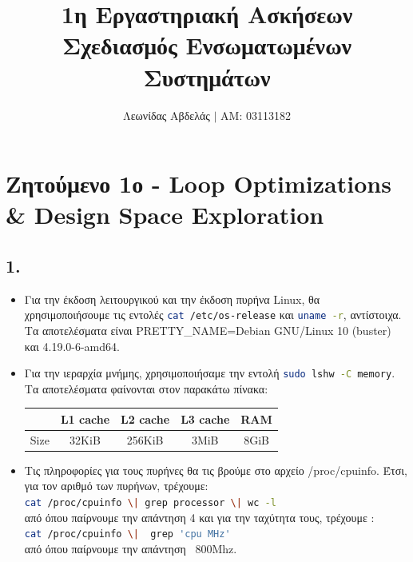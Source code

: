 \documentclass{article}
\title{1η Εργαστηριακή Ασκήσεων \\
        Σχεδιασμός Ενσωματωμένων Συστημάτων}
\newcommand{\english}[1]{\foreignlanguage{english}{{#1}}}
\begin{document}
\date{}
\author{Λεωνίδας Αβδελάς $|$ ΑΜ: 03113182}

\maketitle
\newpage

\section*{Ζητούμενο 1ο - \english{Loop Optimizations \\ \& Design Space Exploration}}

\subsection*{1.}
\begin{itemize}
    \item Για την έκδοση λειτουργικού και την έκδοση πυρήνα \english{Linux}, θα χρησιμοποιήσουμε τις εντολές \english{\lstinline[language=bash]{cat /etc/os-release}} και \english{\lstinline[language=bash]{uname -r}}, αντίστοιχα. Τα αποτελέσματα είναι \english{PRETTY\_NAME=Debian GNU/Linux 10 (buster)} και \english{4.19.0-6-amd64}.
    \item Για την ιεραρχία μνήμης, χρησιμοποιήσαμε την εντολή \english{\lstinline[language=bash]{sudo lshw -C memory}}. Τα αποτελέσματα φαίνονται στον παρακάτω πίνακα:\\
    \begin{otherlanguage}{english}
        \begin{center}
            \begin{tabular}{|c|c|c|c|c|}\hline
                & L1 cache & L2 cache & L3 cache & RAM \\ \hline
                Size & 32KiB & 256KiB & 3MiB & 8GiB \\ \hline
           \end{tabular}
        \end{center}
    \end{otherlanguage}
    \item Τις πληροφορίες για τους πυρήνες θα τις βρούμε στο αρχείο \english{/proc/cpuinfo}. Έτσι, για τον αριθμό των πυρήνων, τρέχουμε:
    \\ \english{\lstinline[language=bash]{cat /proc/cpuinfo \| grep processor \| wc -l}} \\
    από όπου παίρνουμε την απάντηση 4 και για την ταχύτητα τους, τρέχουμε :\\
    \english{\lstinline[language=bash]{cat /proc/cpuinfo \|  grep 'cpu MHz'}} \\
    από όπου παίρνουμε την απάντηση \english{~800Mhz}.
\end{itemize}
\end{document}
